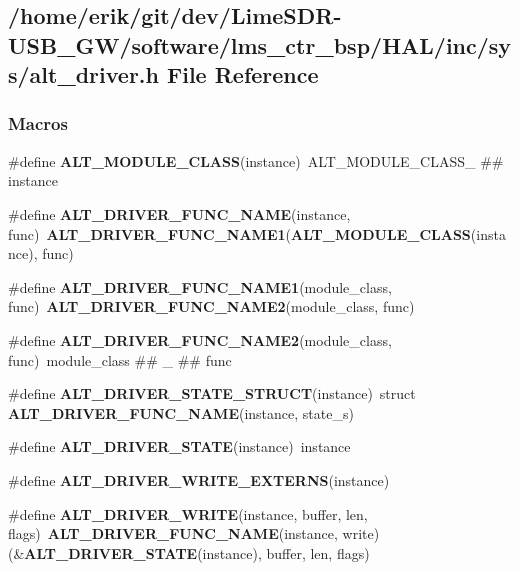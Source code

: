 \subsection{/home/erik/git/dev/\+Lime\+S\+D\+R-\/\+U\+S\+B\+\_\+\+G\+W/software/lms\+\_\+ctr\+\_\+bsp/\+H\+A\+L/inc/sys/alt\+\_\+driver.h File Reference}
\label{alt__driver_8h}
\subsubsection*{Macros}
\begin{DoxyCompactItemize}
\item 
\#define {\bf A\+L\+T\+\_\+\+M\+O\+D\+U\+L\+E\+\_\+\+C\+L\+A\+SS}(instance)~A\+L\+T\+\_\+\+M\+O\+D\+U\+L\+E\+\_\+\+C\+L\+A\+S\+S\+\_\+ \#\# instance
\item 
\#define {\bf A\+L\+T\+\_\+\+D\+R\+I\+V\+E\+R\+\_\+\+F\+U\+N\+C\+\_\+\+N\+A\+ME}(instance,  func)~{\bf A\+L\+T\+\_\+\+D\+R\+I\+V\+E\+R\+\_\+\+F\+U\+N\+C\+\_\+\+N\+A\+M\+E1}({\bf A\+L\+T\+\_\+\+M\+O\+D\+U\+L\+E\+\_\+\+C\+L\+A\+SS}(instance), func)
\item 
\#define {\bf A\+L\+T\+\_\+\+D\+R\+I\+V\+E\+R\+\_\+\+F\+U\+N\+C\+\_\+\+N\+A\+M\+E1}(module\+\_\+class,  func)~{\bf A\+L\+T\+\_\+\+D\+R\+I\+V\+E\+R\+\_\+\+F\+U\+N\+C\+\_\+\+N\+A\+M\+E2}(module\+\_\+class, func)
\item 
\#define {\bf A\+L\+T\+\_\+\+D\+R\+I\+V\+E\+R\+\_\+\+F\+U\+N\+C\+\_\+\+N\+A\+M\+E2}(module\+\_\+class,  func)~module\+\_\+class \#\# \+\_\+ \#\# func
\item 
\#define {\bf A\+L\+T\+\_\+\+D\+R\+I\+V\+E\+R\+\_\+\+S\+T\+A\+T\+E\+\_\+\+S\+T\+R\+U\+CT}(instance)~struct {\bf A\+L\+T\+\_\+\+D\+R\+I\+V\+E\+R\+\_\+\+F\+U\+N\+C\+\_\+\+N\+A\+ME}(instance, state\+\_\+s)
\item 
\#define {\bf A\+L\+T\+\_\+\+D\+R\+I\+V\+E\+R\+\_\+\+S\+T\+A\+TE}(instance)~instance
\item 
\#define {\bf A\+L\+T\+\_\+\+D\+R\+I\+V\+E\+R\+\_\+\+W\+R\+I\+T\+E\+\_\+\+E\+X\+T\+E\+R\+NS}(instance)
\item 
\#define {\bf A\+L\+T\+\_\+\+D\+R\+I\+V\+E\+R\+\_\+\+W\+R\+I\+TE}(instance,  buffer,  len,  flags)~{\bf A\+L\+T\+\_\+\+D\+R\+I\+V\+E\+R\+\_\+\+F\+U\+N\+C\+\_\+\+N\+A\+ME}(instance, write)(\&{\bf A\+L\+T\+\_\+\+D\+R\+I\+V\+E\+R\+\_\+\+S\+T\+A\+TE}(instance), buffer, len, flags)

\end{DoxyCompactItemize}
